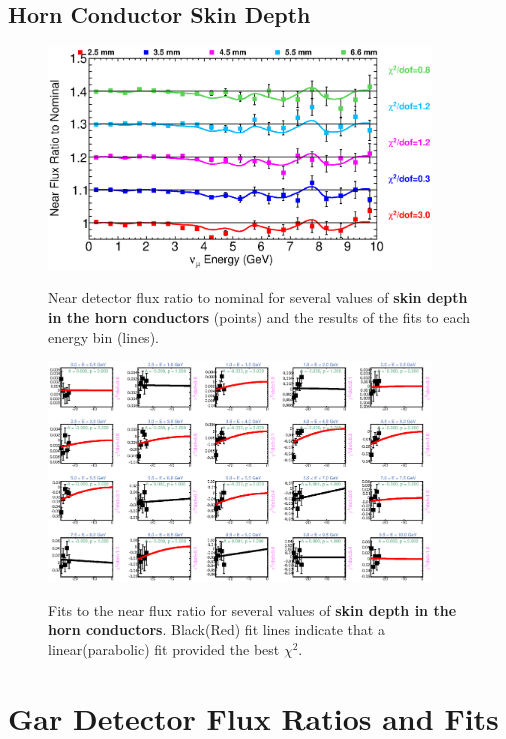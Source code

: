 \clearpage
\subsection{Horn Conductor Skin Depth}

\begin{figure}[ht]
  \begin{center}
    {\includegraphics[width=4.0in]{figures/SkinDepthIC__near_summary.eps}}
  \end{center}
\caption{ Near detector flux ratio to nominal for several values of {\bf skin depth in the horn conductors} (points) and the results of the fits to each energy bin (lines).}
\end{figure}

\begin{figure}[hb]
  \begin{center}
    {\includegraphics[width=4.0in]{figures/SkinDepthIC__near_fits.eps}}
  \end{center}
\caption{ Fits to the near flux ratio for several values of {\bf skin depth in the horn conductors}. Black(Red) fit lines indicate that a linear(parabolic) fit provided the best $\chi^2$. }
\end{figure}

\section{Gar Detector Flux Ratios and Fits}
\label{app:far_plots}

